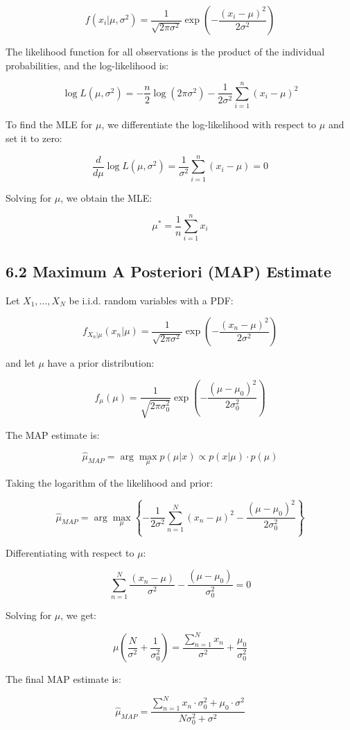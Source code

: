\documentclass{article}
\begin{document}
\[
f(x_i|\mu, \sigma^2) = \frac{1}{\sqrt{2\pi\sigma^2}} \exp\left(- \frac{(x_i - \mu)^2}{2\sigma^2}\right)
\]

The likelihood function for all observations is the product of the individual probabilities, and the log-likelihood is:

\[
\log L(\mu, \sigma^2) = -\frac{n}{2} \log(2\pi\sigma^2) - \frac{1}{2\sigma^2} \sum_{i=1}^{n} (x_i - \mu)^2
\]

To find the MLE for $\mu$, we differentiate the log-likelihood with respect to $\mu$
and set it to zero:

\[
\frac{d}{d\mu} \log L(\mu, \sigma^2) = \frac{1}{\sigma^2} \sum_{i=1}^{n} (x_i - \mu) = 0
\]

Solving for $\mu$, we obtain the MLE:

\[
\mu^* = \frac{1}{n} \sum_{i=1}^{n} x_i
\]

\subsection*{6.2 Maximum A Posteriori (MAP) Estimate}
Let $X_1, \dots, X_N$ be i.i.d. random variables with a PDF:

\[
f_{X_n|\mu}(x_n|\mu) = \frac{1}{\sqrt{2\pi\sigma^2}} \exp\left(- \frac{(x_n - \mu)^2}{2\sigma^2}\right)
\]

and let $\mu$ have a prior distribution:

\[
f_\mu(\mu) = \frac{1}{\sqrt{2\pi\sigma_0^2}} \exp\left(- \frac{(\mu - \mu_0)^2}{2\sigma_0^2}\right)
\]

The MAP estimate is:

\[
\hat{\mu}_{MAP} = \arg\max_\mu p(\mu|x) \propto p(x|\mu) \cdot p(\mu)
\]

Taking the logarithm of the likelihood and prior:

\[
\hat{\mu}_{MAP} = \arg\max_\mu \left\{-\frac{1}{2\sigma^2} \sum_{n=1}^{N} (x_n - \mu)^2 - \frac{(\mu - \mu_0)^2}{2\sigma_0^2}\right\}
\]

Differentiating with respect to $\mu$:

\[
\sum_{n=1}^{N} \frac{(x_n - \mu)}{\sigma^2} - \frac{(\mu - \mu_0)}{\sigma_0^2} = 0
\]

Solving for $\mu$, we get:

\[
\mu \left(\frac{N}{\sigma^2} + \frac{1}{\sigma_0^2}\right) = \frac{\sum_{n=1}^{N} x_n}{\sigma^2} + \frac{\mu_0}{\sigma_0^2}
\]

The final MAP estimate is:

\[
\hat{\mu}_{MAP} = \frac{\sum_{n=1}^{N} x_n \cdot \sigma_0^2 + \mu_0 \cdot \sigma^2}{N\sigma_0^2 + \sigma^2}
\]
\end{document}
